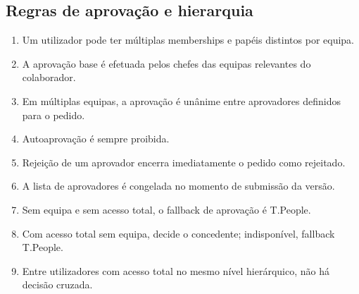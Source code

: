\documentclass[11pt,a4paper,twoside]{article}
\begin{document}
\subsection{Regras de aprovação e hierarquia}
\begin{enumerate}
  \item Um utilizador pode ter múltiplas memberships e papéis distintos por equipa.
  \item A aprovação base é efetuada pelos chefes das equipas relevantes do colaborador.
  \item Em múltiplas equipas, a aprovação é unânime entre aprovadores definidos para o pedido.
  \item Autoaprovação é sempre proibida.
  \item Rejeição de um aprovador encerra imediatamente o pedido como rejeitado.
  \item A lista de aprovadores é congelada no momento de submissão da versão.
  \item Sem equipa e sem acesso total, o fallback de aprovação é T.People.
  \item Com acesso total sem equipa, decide o concedente; indisponível, fallback T.People.
  \item Entre utilizadores com acesso total no mesmo nível hierárquico, não há decisão cruzada.
\end{enumerate}
\end{document}

